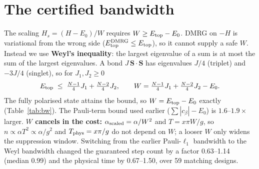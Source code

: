 \documentclass[11pt]{article}
\begin{document}
\section{The certified bandwidth}\label{sec:bandwidth}
The scaling $H_s=(H-E_0)/W$ requires $W\geq E_{\rm top}-E_0$. DMRG on $-H$ is variational from the wrong side ($E_{\rm top}^{\rm DMRG}\leq E_{\rm top}$), so it cannot supply a safe $W$. Instead we use \textbf{Weyl's inequality}: the largest eigenvalue of a sum is at most the sum of the largest eigenvalues. A bond $J\,\mathbf S\!\cdot\!\mathbf S$ has eigenvalues $J/4$ (triplet) and $-3J/4$ (singlet), so for $J_1,J_2\geq0$
\[
E_{\rm top}\;\leq\;\tfrac{N-1}{4}J_1+\tfrac{N-2}{4}J_2,\qquad W=\tfrac{N-1}{4}J_1+\tfrac{N-2}{4}J_2-E_0 .
\]
The fully polarised state attains the bound, so $W=E_{\rm top}-E_0$ exactly (Table~\ref{tab:bw}). The Pauli-term bound used earlier ($\sum|c_\beta|-E_0$) is $1.6$--$1.9\times$ larger. \textbf{$W$ cancels in the cost:} $\alpha_{\rm scaled}=\alpha/W^2$ and $T=x\pi W/g$, so $n\propto\alpha T^2\propto\alpha/g^2$ and $T_{\rm phys}=x\pi/g$ do not depend on $W$; a looser $W$ only widens the suppression window. Switching from the earlier Pauli-$\ell_1$ bandwidth to the Weyl bandwidth changed the guaranteed step count by a factor 0.63--1.14 (median 0.99) and the physical time by 0.67--1.50, over 59 matching designs.
\end{document}
